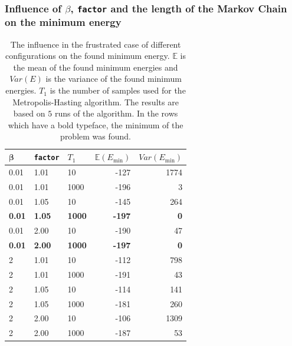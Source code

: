 \documentclass[10pt,a4paper]{article}
\begin{document}
\newpage
\subsubsection{Influence of $\beta$, \texttt{factor} and the length of the Markov Chain on the minimum energy}

\begin{table}[h]
\centering
\begin{tabular}{|lll|rr|}
\hline
$\mathbf{\beta}$ & \texttt{factor} & $T_1$ & $\mathbb{E}(E_{\min})$ & $Var(E_{\min})$\\
\hline
0.01 & 1.01 & 10 & -127 & 1774\\
0.01 & 1.01 & 1000 & -196 & 3\\
0.01 & 1.05 & 10 & -145 & 264\\
\textbf{0.01} & \textbf{1.05} & \textbf{1000} & \textbf{-197} & \textbf{0}\\
0.01 & 2.00 & 10 & -190 & 47\\
\textbf{0.01} & \textbf{2.00} & \textbf{1000} & \textbf{-197} & \textbf{0}\\
2 & 1.01 & 10 & -112 & 798\\
2 & 1.01 & 1000 & -191 & 43\\
2 & 1.05 & 10 & -114 & 141\\
2 & 1.05 & 1000 & -181 & 260\\
2 & 2.00 & 10 & -106 & 1309\\
2 & 2.00 & 1000 & -187 & 53\\
\hline
\end{tabular}
\caption{The influence in the frustrated case of different configurations on the found minimum energy. $\mathbb{E}$ is the mean of the found minimum energies and $Var(E)$ is the variance of the found minimum energies. $T_1$ is the number of samples used for the Metropolis-Hasting algorithm. The results are based on $5$ runs of the algorithm. In the rows which have a bold typeface, the minimum of the problem was found.}
\label{tab:parameters_frustrated}
\end{table}
\end{document}
